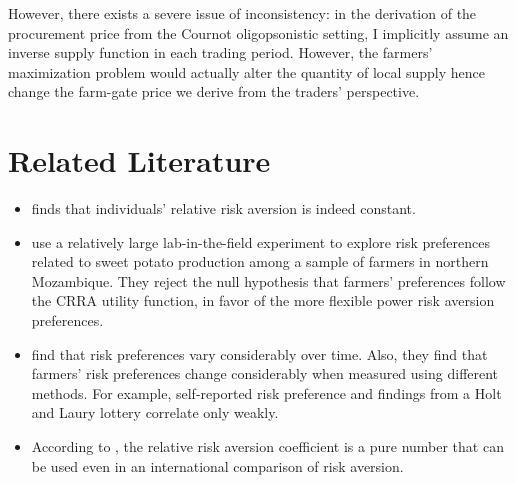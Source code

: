 \documentclass[12pt]{article}
\begin{document}
However, there exists a severe issue of inconsistency: in the derivation of the procurement price from the Cournot oligopsonistic setting, I implicitly assume an inverse supply function in each trading period. However, the farmers' maximization problem would actually alter the quantity of local supply hence change the farm-gate price we derive from the traders' perspective. 




\section{Related Literature}
\begin{itemize}
    \item \cite{chiappori2011relative} finds that individuals’ relative risk aversion is indeed constant. 
    
    \item \cite{de2014measuring} use a relatively large lab-in-the-field experiment to explore risk preferences related to sweet potato production among a sample of farmers in northern Mozambique. They reject the null hypothesis that farmers' preferences follow the CRRA utility function, in favor of the more flexible power risk aversion preferences. 

    \item \cite{finger2023stability} find that risk preferences vary considerably over time. Also, they find that farmers' risk preferences change considerably when measured using different methods. For example, self-reported risk preference and findings from a Holt and Laury lottery correlate only weakly. 
    
    \item According to \cite{hardaker2000some}, the relative risk aversion coefficient is a pure number that can be used even in an international comparison of risk aversion.
\end{itemize}

\newpage

\end{document}

